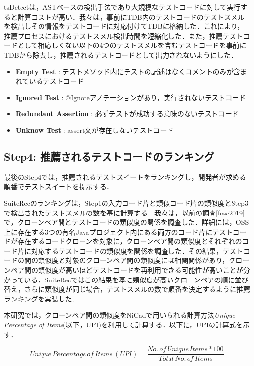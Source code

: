 \documentclass[12pt]{jarticle} %
\begin{document}
{\sf tsDetect}は，ASTベースの検出手法であり大規模なテストコードに対して実行すると計算コストが高い．我々は，事前にTDB内のテストコードのテストスメルを検出しその情報をテストコードに対応付けてTDBに格納した．これにより，推薦プロセスにおけるテストスメル検出時間を短縮化した．また，推薦テストコードとして相応しくない以下の4つのテストスメルを含むテストコードを事前にTDBから除去し，推薦されるテストコードとして出力されないようにした．

\begin{itemize}
\item \textbf{Empty Test} : テストメソッド内にテストの記述はなくコメントのみが含まれているテストコード
\item \textbf{Ignored Test} : @Ignoreアノテーションがあり，実行されないテストコード
\item \textbf{Redundant Assertion} : 必ずテストが成功する意味のないテストコード
\item \textbf{Unknow Test} : assert文が存在しないテストコード
\end{itemize}

\subsection{Step4: 推薦されるテストコードのランキング}

最後のStep4では，推薦されるテストスイートをランキングし，開発者が求める順番でテストスイートを提示する．

SuiteRecのランキングは，Step1の入力コード片と類似コード片の類似度とStep3で検出されたテストスメルの数を基に計算する．我々は，以前の調査[fose2019]で，クローンペア間とテストコードの類似度の関係を調査した．詳細には，OSS上に存在する3つの有名Javaプロジェクト内にある両方のコード片にテストコードが存在するコードクローンを対象に，クローンペア間の類似度とそれぞれのコード片に対応するテストコードの類似度を関係を調査した．その結果，テストコードの間の類似度と対象のクローンペア間の類似度には相関関係があり，クローンペア間の類似度が高いほどテストコードを再利用できる可能性が高いことが分かっている．SuiteRecではこの結果を基に類似度が高いクローンペアの順に並び替え，さらに類似度が同じ場合，テストスメルの数で順番を決定するように推薦ランキングを実装した．

本研究では，クローンペア間の類似度をNiCadで用いられる計算方法{\it Unique Percentage of Items}(以下，UPI)を利用して計算する．以下に，UPIの計算式を示す．

\[
  Unique\, Percentage\, of\, Items\, (UPI) =
  \frac{No.\, of\, Unique\, Items * 100}{Total\, No.\, of\, Items}
\]
\end{document}
